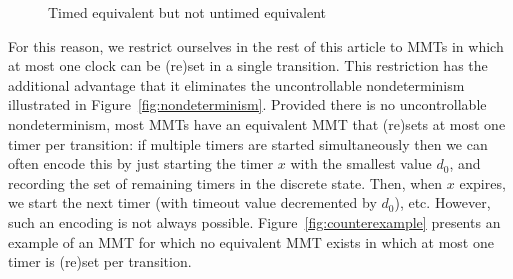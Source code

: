 \begin{figure}
\vspace{-1em}
\begin{center}

\caption{Timed equivalent but not untimed equivalent}
\label{fig:twoequivalentone}
\end{center}
\end{figure}
For this reason, we restrict ourselves in the rest of this article to MMTs in which at most
one clock can be (re)set in a single transition. This restriction has the additional advantage that it
eliminates the uncontrollable nondeterminism illustrated in Figure~\ref{fig:nondeterminism}.
Provided there is no uncontrollable nondeterminism, most MMTs
have an equivalent MMT that (re)sets at most one timer per transition:
if multiple timers are started simultaneously then we can often encode this by just
starting the timer $x$ with the smallest value $d_0$, and recording the set of remaining timers in the discrete state.
Then, when $x$ expires, we start the next timer (with timeout value decremented by $d_0$), etc.
However, such an encoding is not always possible. 
\iflong
Figure~\ref{fig:counterexample} presents an example of an MMT for which no equivalent MMT exists
in which at most one timer is (re)set per transition.
